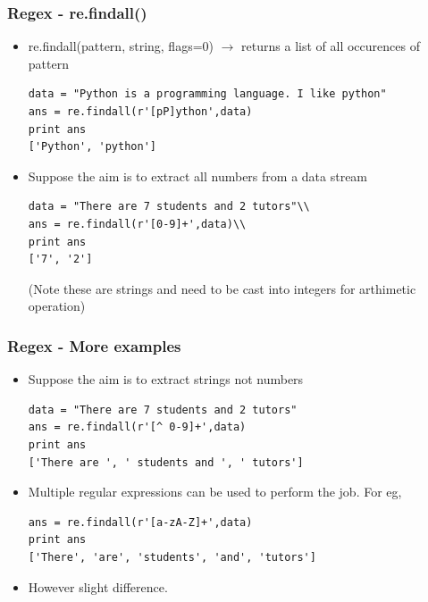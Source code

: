 \documentclass[xcolor=table,10pt]{beamer}
\begin{document}
\begin{frame}[fragile]
\frametitle{Regex - re.findall()}
\begin{itemize}
\item re.findall(pattern, string, flags=0) $\rightarrow$ returns a list of all occurences of pattern\\

\begin{verbatim}
data = "Python is a programming language. I like python"
ans = re.findall(r'[pP]ython',data)
print ans
['Python', 'python']
\end{verbatim}
\small
\item Suppose the aim is to extract all numbers from a data stream

\begin{verbatim}
data = "There are 7 students and 2 tutors"\\
ans = re.findall(r'[0-9]+',data)\\
print ans
['7', '2']
\end{verbatim}
\small
(Note these are strings and need to be cast into integers for arthimetic operation)\\
\end{itemize}
\end{frame}



\begin{frame}[fragile]
\frametitle{Regex - More examples}
\begin{itemize}
\item Suppose the aim is to extract strings not numbers

\begin{verbatim}
data = "There are 7 students and 2 tutors"
ans = re.findall(r'[^ 0-9]+',data)
print ans
['There are ', ' students and ', ' tutors']
\end{verbatim}
\small
\item Multiple regular expressions can be used to perform the job. For eg,\\

\begin{verbatim}
ans = re.findall(r'[a-zA-Z]+',data)
print ans
['There', 'are', 'students', 'and', 'tutors']
\end{verbatim}
\small
\item However slight difference. 
\end{itemize}
\end{frame}
\end{document}
